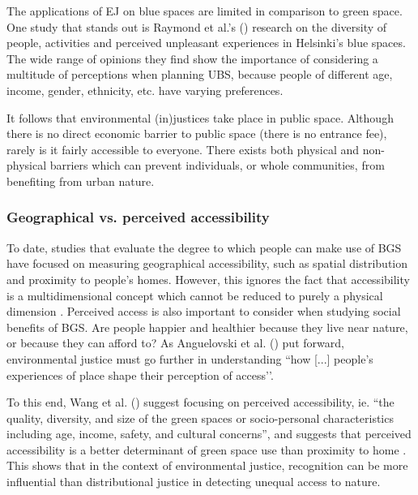 \documentclass{article}
\begin{document}

The applications of EJ on blue spaces are limited in comparison to green space. One study that stands out is Raymond et al.'s (\citeyear{raymond2016integrating}) research on the diversity of people, activities and perceived unpleasant experiences in Helsinki's blue spaces. The wide range of opinions they find show the importance of considering a multitude of perceptions when planning UBS, because people of different age, income, gender, ethnicity, etc. have varying preferences.

It follows that environmental (in)justices take place in public space. Although there is no direct economic barrier to public space (there is no entrance fee), rarely is it fairly accessible to everyone. There exists both physical and non-physical barriers which can prevent individuals, or whole communities, from benefiting from urban nature.

\subsubsection{Geographical vs. perceived accessibility}

To date, studies that evaluate the degree to which people can make use of BGS have focused on measuring geographical accessibility, such as spatial distribution and proximity to people’s homes. %
However, this ignores the fact that accessibility is a multidimensional concept which cannot be reduced to purely a physical dimension \parencite{wang2015physical}. Perceived access is also important to consider when studying social benefits of BGS. Are people happier and healthier because they live near nature, or because they can afford to?
As Anguelovski et al. (\citeyear{anguelovski2020expanding}) put forward, environmental justice must go further in understanding ``how [...] people’s experiences of place shape their perception of access’’.

To this end, Wang et al. (\citeyear{wang2015physical}) suggest focusing on perceived accessibility, ie. ``the quality, diversity, and size of the green spaces or socio-personal characteristics including age, income, safety, and cultural concerns'', and suggests that perceived accessibility is a better determinant of green space use than proximity to home \parencite{wang2015comparison}.
This shows that in the context of environmental justice, recognition can be more influential than distributional justice in detecting unequal access to nature. 
\end{document}
